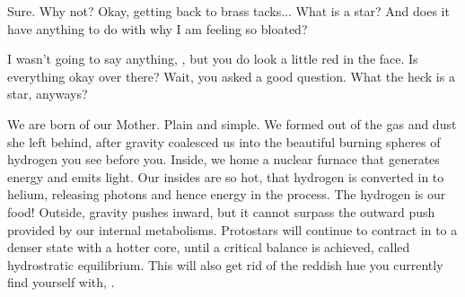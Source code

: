 \documentclass[main.tex]{subfiles}
\begin{document}
\par \Sterope Sure.   Why not?   Okay, getting back to brass tacks...  What is a star?  And does it have anything to do with why I am feeling so bloated?

\par \Alcyone I wasn't going to say anything, \rmsterope, but you do look a little red in the face.  Is everything okay over there?  Wait, you asked a good question.  What the heck is a star, anyways?

\par \Maia We are born of our Mother.  Plain and simple.  We formed out of the gas and dust she left behind, after gravity coalesced us into the beautiful burning spheres of hydrogen you see before you.  Inside, we home a nuclear furnace that generates energy and emits light.  Our insides are so hot, that hydrogen is converted in to helium, releasing photons and hence energy in the process.  The hydrogen is our food!  Outside, gravity pushes inward, but it cannot surpass the outward push provided by our internal metabolisms.  Protostars will continue to contract in to a denser state with a hotter core, until a critical balance is achieved, called hydrostratic equilibrium.  This will also get rid of the reddish hue you currently find yourself with, \rmsterope.

\end{document}
